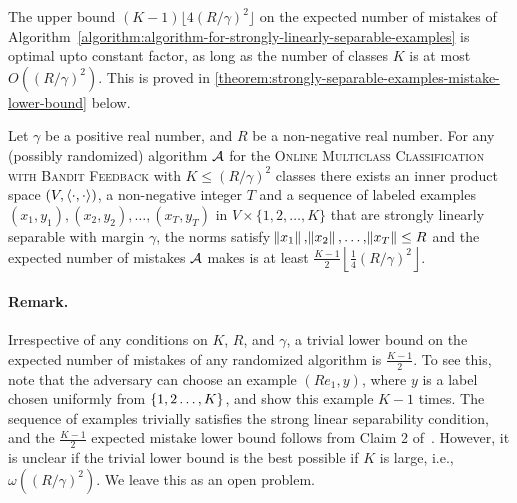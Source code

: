 The upper bound $(K-1) \lfloor 4(R/\gamma)^2 \rfloor$ on the expected number of
mistakes of
Algorithm~\ref{algorithm:algorithm-for-strongly-linearly-separable-examples} is
optimal upto constant factor, as long as the number of classes $K$ is
at most $O((R/\gamma)^2)$. This is proved in
\autoref{theorem:strongly-separable-examples-mistake-lower-bound} below.

\begin{theorem}
\label{theorem:strongly-separable-examples-mistake-lower-bound}
Let $\gamma$ be a positive real number, and $R$ be a non-negative real
number. For any (possibly randomized) algorithm $\mathcal{A}$ for the \textsc{Online
Multiclass Classification with Bandit Feedback} with $K \le
(R/\gamma)^2$ classes there exists an inner product space $(V,
\left\langle \cdot, \cdot \right\rangle)$, a non-negative integer $T$ and a sequence of labeled
examples $(x_1, y_1), (x_2, y_2), \dots, (x_T, y_T)$ in $V \times
\{1,2,\dots,K\}$ that are strongly linearly separable with margin $\gamma$, the
norms satisfy $\norm{x_1}, \norm{x_2}, \dots, \norm{x_T} \le R$ and the expected
number of mistakes $\mathcal{A}$ makes is at least $\frac{K-1}{2} \left\lfloor
\frac{1}{4} (R/\gamma)^2 \right\rfloor$.
\end{theorem}

\paragraph{Remark.} Irrespective of any conditions on $K$, $R$, and $\gamma$, a trivial lower bound
on the expected number of mistakes of any randomized algorithm is
$\frac{K-1}{2}$. To see this, note that the adversary can choose an example $(R e_1, y)$,
where $y$ is a label chosen uniformly from $\cbr{1,2\ldots,K}$, and show this example $K-1$ times.
The sequence of examples trivially satisfies the strong linear separability condition, and
the $\frac{K-1}{2}$ expected mistake lower bound follows from Claim 2 of~\citet{Daniely-Helbertal-2013}.
However, it is unclear if the trivial lower bound is the best possible if $K$ is large,
i.e., $\omega((R/\gamma)^2)$. We leave this as an open problem.

